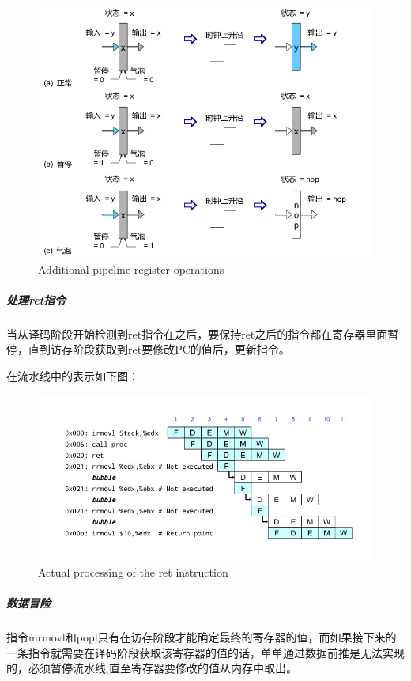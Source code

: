 \begin{figure}[htbp]
\centering
\includegraphics{img/eg-pipe-reg-full.png}
\caption{Additional pipeline register operations}
\end{figure}

\subparagraph{处理ret指令}\label{ux5904ux7406retux6307ux4ee4}

当从译码阶段开始检测到ret指令在之后，要保持ret之后的指令都在寄存器里面暂停，直到访存阶段获取到ret要修改PC的值后，更新指令。

在流水线中的表示如下图：

\begin{figure}[htbp]
\centering
\includegraphics{img/prog7.png}
\caption{Actual processing of the ret instruction}
\end{figure}

\subparagraph{数据冒险}\label{ux6570ux636eux5192ux9669-1}

指令mrmovl和popl只有在访存阶段才能确定最终的寄存器的值，而如果接下来的一条指令就需要在译码阶段获取该寄存器的值的话，单单通过数据前推是无法实现的，必须暂停流水线,直至寄存器要修改的值从内存中取出。

